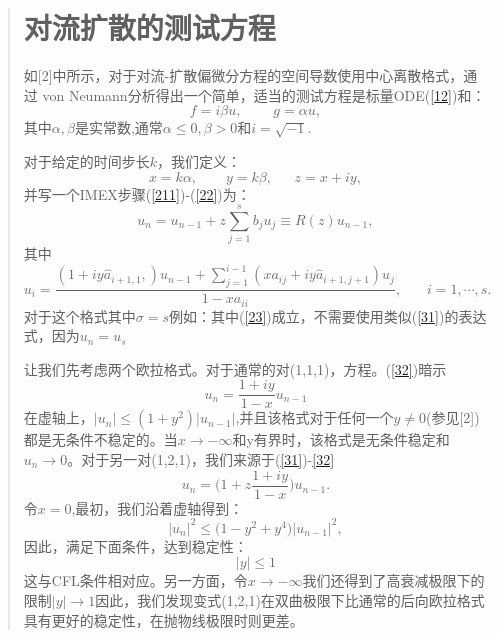 \documentclass{article}
\begin{document}
\begin{CJK}{UTF8}{gkai}
\begin{quotation}
\section{对流扩散的测试方程}

如[2]中所示，对于对流-扩散偏微分方程的空间导数使用中心离散格式，通过 von Neumann分析得出一个简单，适当的测试方程是标量ODE(\ref{12})和：
\begin{equation*}
f=i\beta u,~~~~~~~~~~g=\alpha u,
\end{equation*}
其中$\alpha,\beta$是实常数,通常$\alpha\le 0,\beta>0$和$i=\sqrt{-1}$.

对于给定的时间步长$k$，我们定义：
\begin{equation*}
x=k\alpha,~~~~~~~~~y=k\beta,~~~~~~~z=x+iy,
\end{equation*}
并写一个IMEX步骤(\ref{211})-(\ref{22})为：
\begin{equation}
u_{n}=u_{n-1}+z\sum_{j=1}^{s}b_{j}u_{j}\equiv R(z)u_{n-1},
\label{31}
\end{equation}
其中
\begin{equation}
u_{i}=\frac{(1+iy\widehat{a}_{i+1,1},)u_{n-1}+\sum_{j=1}^{i-1}(xa_{ij}+iy\widehat{a}_{i+1,j+1})u_{j}}{1-xa_{ii}},~~~~~~~~i=1,\cdots,s.
\label{32}
\end{equation}
对于这个格式其中$\sigma=s$例如：其中(\ref{23})成立，不需要使用类似(\ref{31})的表达式，因为$u_{n}=u_{s}$

让我们先考虑两个欧拉格式。对于通常的对(1,1,1)，方程。(\ref{32})暗示
\begin{equation*}
u_{n}=\frac{1+iy}{1-x} u_{n-1}
\end{equation*}
在虚轴上，$|u_{n}|\le (1+y^2)|u_{n-1}|$,并且该格式对于任何一个$y\ne 0$(参见[2])都是无条件不稳定的。当$x\to -\infty$和y有界时，该格式是无条件稳定和$u_{n}\to 0$。对于另一对(1,2,1)，我们来源于(\ref{31})-\ref{32}
\begin{equation*}
u_{n}=\bigg(1+z\frac{1+iy}{1-x}\biggl)u_{n-1}.
\end{equation*}
令$x=0$,最初，我们沿着虚轴得到：
\begin{equation*}
|u_{n}|^2\le \bigg(1-y^2+y^4\biggl)|u_{n-1}|^2,
\end{equation*}
因此，满足下面条件，达到稳定性：
\begin{equation*}
|y|\le 1
\end{equation*}
这与CFL条件相对应。另一方面，令$x\to -\infty$我们还得到了高衰减极限下的限制$|y|\to 1$因此，我们发现变式(1,2,1)在双曲极限下比通常的后向欧拉格式具有更好的稳定性，在抛物线极限时则更差。


\end{quotation}
\end{CJK}
\end{document}
